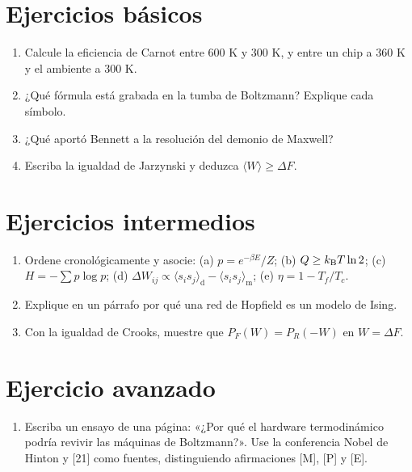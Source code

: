 \documentclass[11pt,a4paper]{article}
\begin{document}

\section{Ejercicios básicos}
\begin{enumerate}[label=\textbf{B\arabic*.}]
\item Calcule la eficiencia de Carnot entre 600 K y 300 K, y entre un chip a 360 K y el ambiente a 300 K.
\item ¿Qué fórmula está grabada en la tumba de Boltzmann? Explique cada símbolo.
\item ¿Qué aportó Bennett a la resolución del demonio de Maxwell?
\item Escriba la igualdad de Jarzynski y deduzca $\langle W\rangle\ge\Delta F$.
\end{enumerate}

\section{Ejercicios intermedios}
\begin{enumerate}[label=\textbf{I\arabic*.}]
\item Ordene cronológicamente y asocie: (a) $p=e^{-\beta E}/Z$; (b) $Q\ge k_{\mathrm B} T\ln2$; (c) $H=-\sum p\log p$; (d) $\Delta W_{ij}\propto\langle s_is_j\rangle_{\text{d}}-\langle s_is_j\rangle_{\text{m}}$; (e) $\eta=1-T_f/T_c$.
\item Explique en un párrafo por qué una red de Hopfield es un modelo de Ising.
\item Con la igualdad de Crooks, muestre que $P_F(W)=P_R(-W)$ en $W=\Delta F$.
\end{enumerate}

\section{Ejercicio avanzado}
\begin{enumerate}[label=\textbf{A\arabic*.}]
\item Escriba un ensayo de una página: «¿Por qué el hardware termodinámico podría revivir las máquinas de Boltzmann?». Use la conferencia Nobel de Hinton y [21] como fuentes, distinguiendo afirmaciones [M], [P] y [E].
\end{enumerate}
\end{document}

